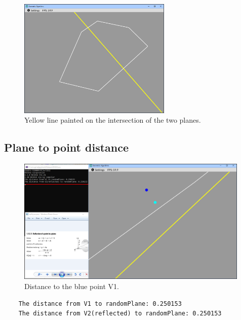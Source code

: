 \documentclass[12pt,a4paper,english]{article}
\begin{document}
\begin{figure}[H]
    \centering
    \includegraphics[width=0.65\textwidth]{p2b-2}
    \caption[]{Yellow line painted on the intersection of the two planes.}
    \label{fig:p2b-2}
\end{figure}

\subsection{Plane to point distance}

\begin{figure}[H]
    \centering
    \includegraphics[width=0.99\textwidth]{p2b-3}
    \caption[]{Distance to the blue point V1.}
    \label{fig:p2b-3}
\end{figure}

\begin{verbatim}
    The distance from V1 to randomPlane: 0.250153
    The distance from V2(reflected) to randomPlane: 0.250153
\end{verbatim}
\end{document}

